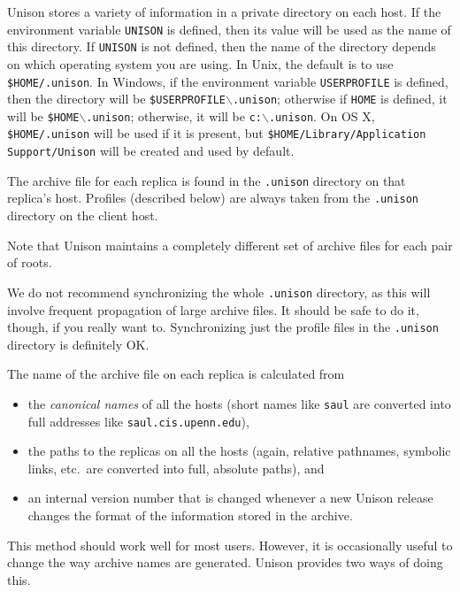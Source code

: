 \documentclass{article}
\begin{document}

Unison stores a variety of information in a private directory on each
host.  If the environment variable {\tt UNISON} is defined, then its
value will be used as the name of this directory.  If {\tt UNISON} is
not defined, then the name of the directory depends on which
operating system you are using.  In Unix, the default is to use
{\tt \$HOME/.unison}.
In Windows, if the environment variable
{\tt USERPROFILE} is defined, then the directory will be
{\tt \$USERPROFILE$\backslash$.unison};
otherwise if {\tt HOME} is defined, it will be
{\tt \$HOME$\backslash$.unison};
otherwise, it will be
{\tt c:$\backslash$.unison}.  
On OS X, 
{\tt \$HOME/.unison} will be used if it is present, but 
{\tt \$HOME/Library/Application Support/Unison} will be created and used by
default. 

The archive file for each replica is found in the {\tt .unison}
directory on that replica's host.  Profiles (described below) are
always taken from the {\tt .unison} directory on the client host.

Note that Unison maintains a completely different set of archive files
for each pair of roots.

We do not recommend synchronizing the whole {\tt .unison} directory, as this
will involve frequent propagation of large archive files.  It should be safe
to do it, though, if you really want to.  Synchronizing just the profile
files in the {\tt .unison} directory is definitely OK.



The name of the archive file on each replica is calculated from 
\begin{itemize}
\item the {\em canonical names} of all the hosts (short names like
  \verb|saul| are converted into full addresses like \verb|saul.cis.upenn.edu|), 
\item the paths to the replicas on all the hosts (again, relative
  pathnames, symbolic links, etc.\ are converted into full, absolute paths), and 
\item an internal version number that is changed whenever a new Unison
  release changes the format of the information stored in the archive.
\end{itemize}
This method should work well for most users.  However, it is occasionally
useful to change the way archive names are generated.  Unison provides
two ways of doing this.
\end{document}
